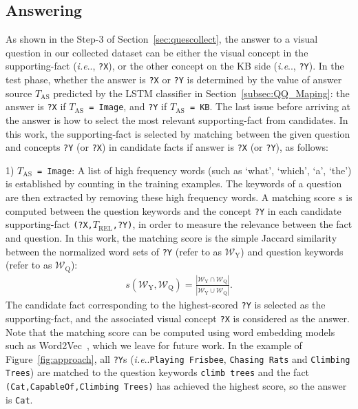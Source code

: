 \documentclass[10pt,journal]{IEEEtran}
\makeatletter
\DeclareRobustCommand\onedot{\futurelet\@let@token\@onedot}
\def\@onedot{\ifx\@let@token.\else.\null\fi\xspace}
\def\ie{\emph{i.e}\onedot} \def\Ie{\emph{I.e}\onedot}
\def\bluett{}
\makeatother
\begin{document}
\subsection{Answering}
\label{sec:answering}

\bluett{
As shown in the Step-$3$ of Section~\ref{sec:quescollect}, 
the answer to a visual question in our collected dataset can be either the visual concept
in the supporting-fact (\ie, \texttt{?X}), or the other concept on the KB side 
(\ie, \texttt{?Y}).
In the test phase, whether the answer is \texttt{?X} or \texttt{?Y} is determined by the value of
answer source \texttt{$T_{\mbox{AS}}$} predicted by the LSTM classifier in Section~\ref{subsec:QQ_Maping}: 
the answer is \texttt{?X} if \texttt{$T_{\mbox{AS}}$ = Image}, and \texttt{?Y} if \texttt{$T_{\mbox{AS}}$ = KB}.
The last issue before arriving at the answer is how to select the most relevant supporting-fact from candidates.
In this work, the supporting-fact is selected by matching between the given question and 
concepts \texttt{?Y} (or \texttt{?X}) in candidate facts if answer is \texttt{?X} (or \texttt{?Y}), 
as follows:}

\bluett{
1) {\texttt{$T_{\mbox{AS}}$ = Image}}:
A list of high frequency words (such as `what', `which', `a', `the') 
is established by counting in the training examples.
The keywords of a question are then extracted by removing these high frequency words.
A matching score $s$ is computed between the question keywords and 
the concept \texttt{?Y} in each candidate supporting-fact \texttt{(?X,$T_{\mbox{REL}}$,?Y)},
in order to measure the relevance between the fact and question. 
In this work, the matching score is the simple Jaccard similarity between the normalized word sets of \texttt{?Y}
(refer to as $\mathcal{W}_{\mathrm{Y}}$) and question keywords (refer to as $\mathcal{W}_{\mathrm{Q}}$):
\begin{align}
{s}(\mathcal{W}_{\mathrm{Y}}, \mathcal{W}_{\mathrm{Q}}) 
		= \frac{|\mathcal{W}_{\mathrm{Y}} \cap \mathcal{W}_{\mathrm{Q}}|}{ |\mathcal{W}_{\mathrm{Y}} \cup \mathcal{W}_{\mathrm{Q}}|}.
\end{align}
The candidate fact corresponding to the highest-scored \texttt{?Y} is selected as the supporting-fact,
and the associated visual concept \texttt{?X} is considered as the answer.
Note that the matching score can be computed using word embedding models such as Word2Vec~\cite{mikolov2013efficient}, which we leave for future work.
In the example of Figure~\ref{fig:approach}, all \texttt{?Y}s (\ie \texttt{Playing Frisbee}, \texttt{Chasing Rats} and \texttt{Climbing Trees}) are matched to the question keywords \texttt{climb trees} and
the fact \texttt{(Cat,CapableOf,Climbing Trees)} has achieved the highest score, so the answer is \texttt{Cat}.
}
\end{document}
